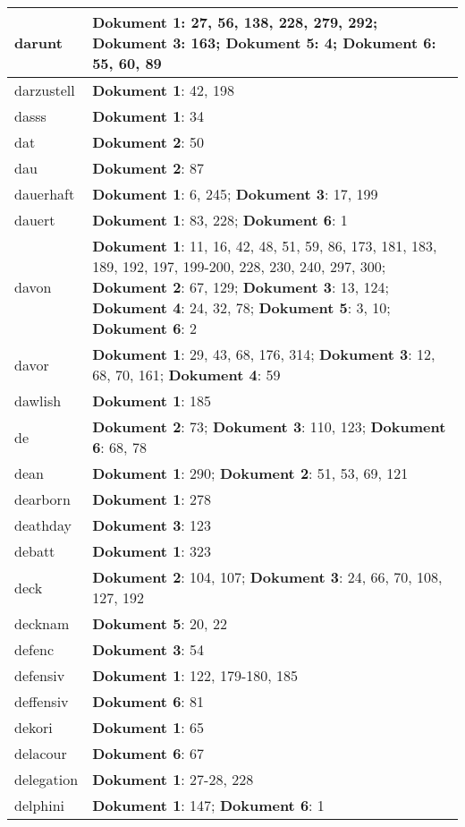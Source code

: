 \documentclass[a5paper]{article}
\begin{document}
\begin{longtable}[l]{|l|p{3in}|}
\hline
darunt & \textbf{Dokument 1}: 27, 56, 138, 228, 279, 292; \textbf{Dokument 3}: 163; \textbf{Dokument 5}: 4; \textbf{Dokument 6}: 55, 60, 89 \\
\hline
darzustell & \textbf{Dokument 1}: 42, 198 \\
\hline
dasss & \textbf{Dokument 1}: 34 \\
\hline
dat & \textbf{Dokument 2}: 50 \\
\hline
dau & \textbf{Dokument 2}: 87 \\
\hline
dauerhaft & \textbf{Dokument 1}: 6, 245; \textbf{Dokument 3}: 17, 199 \\
\hline
dauert & \textbf{Dokument 1}: 83, 228; \textbf{Dokument 6}: 1 \\
\hline
davon & \textbf{Dokument 1}: 11, 16, 42, 48, 51, 59, 86, 173, 181, 183, 189, 192, 197, 199-200, 228, 230, 240, 297, 300; \textbf{Dokument 2}: 67, 129; \textbf{Dokument 3}: 13, 124; \textbf{Dokument 4}: 24, 32, 78; \textbf{Dokument 5}: 3, 10; \textbf{Dokument 6}: 2 \\
\hline
davor & \textbf{Dokument 1}: 29, 43, 68, 176, 314; \textbf{Dokument 3}: 12, 68, 70, 161; \textbf{Dokument 4}: 59 \\
\hline
dawlish & \textbf{Dokument 1}: 185 \\
\hline
de & \textbf{Dokument 2}: 73; \textbf{Dokument 3}: 110, 123; \textbf{Dokument 6}: 68, 78 \\
\hline
dean & \textbf{Dokument 1}: 290; \textbf{Dokument 2}: 51, 53, 69, 121 \\
\hline
dearborn & \textbf{Dokument 1}: 278 \\
\hline
deathday & \textbf{Dokument 3}: 123 \\
\hline
debatt & \textbf{Dokument 1}: 323 \\
\hline
deck & \textbf{Dokument 2}: 104, 107; \textbf{Dokument 3}: 24, 66, 70, 108, 127, 192 \\
\hline
decknam & \textbf{Dokument 5}: 20, 22 \\
\hline
defenc & \textbf{Dokument 3}: 54 \\
\hline
defensiv & \textbf{Dokument 1}: 122, 179-180, 185 \\
\hline
deffensiv & \textbf{Dokument 6}: 81 \\
\hline
dekori & \textbf{Dokument 1}: 65 \\
\hline
delacour & \textbf{Dokument 6}: 67 \\
\hline
delegation & \textbf{Dokument 1}: 27-28, 228 \\
\hline
delphini & \textbf{Dokument 1}: 147; \textbf{Dokument 6}: 1 \\

\end{longtable}
\end{document}
